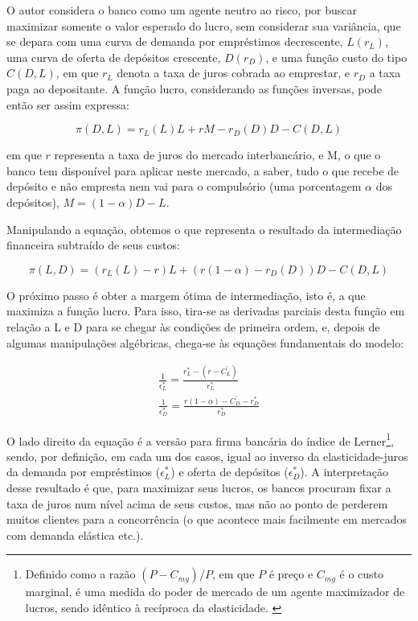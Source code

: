 \documentclass[a4paper,
               article,
               12pt,
               openany,
               oneside,
               english,
               brazil]{abntex2}
\numberwithin{equation}{section}
\begin{document}
    O autor considera o banco como um agente neutro ao risco, por buscar maximizar somente o valor esperado do lucro, sem considerar sua variância, que se depara com uma curva de demanda por empréstimos decrescente, $ L(r_L) $, uma curva de oferta de depósitos crescente, $ D(r_D) $, e uma função custo do tipo $ C(D, L) $, em que $ r_L $ denota a taxa de juros cobrada ao emprestar, e $ r_D $ a taxa paga ao depositante. A função lucro, considerando as funções inversas, pode então ser assim expressa: 
    
    \begin{equation} \pi(D, L) = r_L(L)L + rM - r_D(D)D - C(D, L) \end{equation}
        
    em que $ r $ representa a taxa de juros do mercado interbancário, e M, o que o banco tem disponível para aplicar neste mercado, a saber, tudo o que recebe de depósito e não empresta nem vai para o compulsório (uma porcentagem $\alpha$ dos depósitos), $M = (1 - \alpha)D - L$. 

    Manipulando a equação, obtemos o que representa o resultado da intermediação financeira subtraído de seus custos: 
    
    \begin{equation} \pi(L, D) = (r_L(L) - r)L + (r(1 - \alpha) - r_D(D))D - C(D, L) \end{equation}

    O próximo passo é obter a margem ótima de intermediação, isto é, a que maximiza a função lucro. Para isso, tira-se as derivadas parciais desta função em relação a L e D para se chegar às condições de primeira ordem, e, depois de algumas manipulações algébricas, chega-se às equações fundamentais do modelo:

    \begin{gather}
        \frac{1}{\epsilon^{*}_L} = \frac{r^{*}_L - (r - C^{'}_L)}{r^{*}_L} \\
        \frac{1}{\epsilon^{*}_D} = \frac{r(1-\alpha)-C^{'}_D - r^{*}_D}{r^{*}_D}
    \end{gather}

    O lado direito da equação é a versão para firma bancária do índice de Lerner\footnote{Definido como a razão $(P - C_{mg}) / P$, em que $P$ é preço e $C_{mg}$ é o custo marginal, é uma medida do poder de mercado de um agente maximizador de lucros, sendo idêntico à recíproca da elasticidade. \cite{maudos}}, sendo, por definição, em cada um dos casos, igual ao inverso da elasticidade-juros da demanda por empréstimos ($\epsilon^{*}_L$) e oferta de depósitos ($\epsilon^{*}_D$). A interpretação desse resultado é que, para maximizar seus lucros, os bancos procuram fixar a taxa de juros num nível acima de seus custos, mas não ao ponto de perderem muitos clientes para a concorrência (o que acontece mais facilmente em mercados com demanda elástica etc.).
\end{document}
